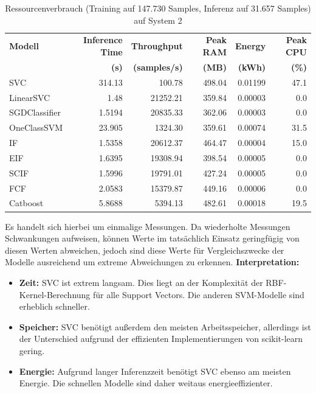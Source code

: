 \documentclass[12pt,oneside]{article}
\begin{document}
	\FloatBarrier
	\begin{table}[h]
		\centering
		\caption{Ressourcenverbrauch (Training auf 147.730 Samples, Inferenz auf 31.657 Samples) auf System 2}
		\label{tab:resources2}
		\begin{tabular}{lrrrrr}
	\toprule
	\textbf{Modell} & \textbf{Inference Time} & \textbf{Throughput} & \textbf{Peak RAM} & \textbf{Energy} & \textbf{Peak CPU} \\
	& \textbf{(s)}           & \textbf{(samples/s)} & \textbf{(MB)} & \textbf{(kWh)} & \textbf{(\%)} \\
	\midrule
	SVC           & 314.13 &   100.78 & 498.04 & 0.01199 & 47.1 \\
	LinearSVC     &   1.48 & 21252.21 & 359.84 & 0.00003 &  0.0 \\
	SGDClassifier & 1.5194 & 20835.33 & 362.06 & 0.00003 &  0.0 \\
	OneClassSVM   & 23.905 &  1324.30 & 359.61 & 0.00074 & 31.5 \\
	IF            & 1.5358 & 20612.37 & 464.47 & 0.00004 & 15.0 \\
	EIF  	      & 1.6395 & 19308.94 & 398.54 & 0.00005 & 0.0 \\
	SCIF		  & 1.5996 & 19791.01 & 427.24 & 0.00005 & 0.0 \\
	FCF			  & 2.0583 & 15379.87 & 449.16 & 0.00006 & 0.0 \\
	Catboost	  & 5.8688 &  5394.13 & 482.61 & 0.00018 & 19.5 \\
	\bottomrule
\end{tabular}
	\end{table}
	\FloatBarrier
	Es handelt sich hierbei um einmalige Messungen. Da wiederholte Messungen Schwankungen aufweisen, können Werte im tatsächlich Einsatz geringfügig von diesen Werten abweichen, jedoch sind diese Werte für Vergleichszwecke der Modelle ausreichend um extreme Abweichungen zu erkennen.
	\textbf{Interpretation:}
	\begin{itemize}
		\item \textbf{Zeit:} SVC ist extrem langsam. Dies liegt an der Komplexität der RBF-Kernel-Berechnung für alle Support Vectors. Die anderen SVM-Modelle sind erheblich schneller.
		
		\item \textbf{Speicher:} SVC benötigt außerdem den meisten Arbeitsspeicher, allerdings ist der Unterschied aufgrund der effizienten Implementierungen von scikit-learn gering.
		
		\item \textbf{Energie:} Aufgrund langer Inferenzzeit benötigt SVC ebenso am meisten Energie. Die schnellen Modelle sind daher weitaus energieeffizienter.
	\end{itemize}
\end{document}
